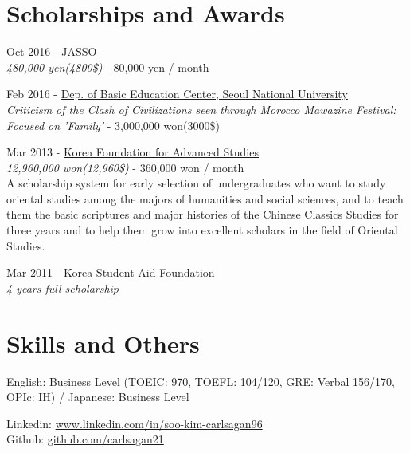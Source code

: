 \documentclass[10pt]{article} %
\begin{document}
\if{}
\section{Scholarships and Awards}

{
Oct 2016 - \href{http://www.jasso.go.jp/ryugaku/tantosha/study_a/short_term_h/index.html}{JASSO}\\
\textit{480,000 yen(4800\$)} - 80,000 yen / month
}

{
Feb 2016 - \href{http://liberaleduenglish.snu.ac.kr/}{Dep. of Basic Education Center, Seoul National University}\\
\textit{Criticism of the Clash of Civilizations seen through Morocco Mawazine Festival: Focused on 'Family'} - 3,000,000 won(3000\$)
}

{
Mar 2013 - \href{http://www.kfas.or.kr/?pCulture=en}{Korea Foundation for Advanced Studies}\\
\textit{12,960,000 won(12,960\$)} - 360,000 won / month\\
A scholarship system for early selection of undergraduates who want to study oriental studies among the majors of humanities and social sciences, and to teach them the basic scriptures and major histories of the Chinese Classics Studies for three years and to help them grow into excellent scholars in the field of Oriental Studies.
}

{
Mar 2011 - \href{http://eng.kosaf.go.kr/jsp/main.jsp}{Korea Student Aid Foundation}\\
\textit{4 years full scholarship}
}
\fi


\section{Skills and Others}

{
English: Business Level (TOEIC: 970, TOEFL: 104/120, GRE: Verbal 156/170, OPIc: IH) / Japanese: Business Level
}

{
Linkedin: \href{https://www.linkedin.com/in/soo-kim-carlsagan96}{www.linkedin.com/in/soo-kim-carlsagan96}\\
Github: \href{https://github.com/carlsagan21}{github.com/carlsagan21}
}
\end{document}
